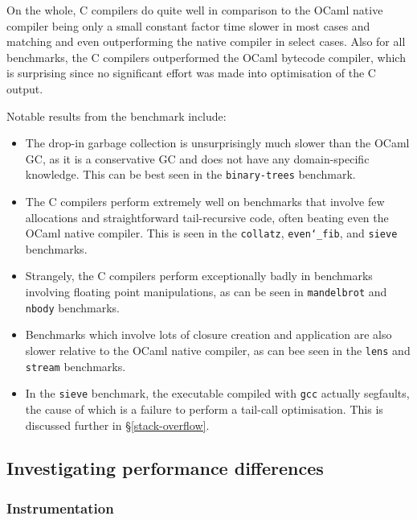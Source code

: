 On the whole, C compilers do quite well in comparison to the OCaml native
compiler being only a small constant factor time slower in most cases and
matching and even outperforming the native compiler in select cases. Also for
all benchmarks, the C compilers outperformed the OCaml bytecode compiler, which
is surprising since no significant effort was made into optimisation of the C
output.

Notable results from the benchmark include:

\begin{itemize}

\item The drop-in garbage collection is unsurprisingly much slower than the
    OCaml GC, as it is a conservative GC and does not have any domain-specific
    knowledge. This can be best seen in the \texttt{binary-trees} benchmark.

\item The C compilers perform extremely well on benchmarks that involve few
    allocations and straightforward tail-recursive code, often beating even the
    OCaml native compiler. This is seen in the \texttt{collatz},
    \texttt{even\char`_fib}, and \texttt{sieve} benchmarks.

\item Strangely, the C compilers perform exceptionally badly in benchmarks
    involving floating point manipulations, as can be seen in
    \texttt{mandelbrot} and \texttt{nbody} benchmarks.

\item Benchmarks which involve lots of closure creation and application are also
    slower relative to the OCaml native compiler, as can bee seen in the
    \texttt{lens} and \texttt{stream} benchmarks.

\item In the \texttt{sieve} benchmark, the executable compiled with \texttt{gcc}
    actually segfaults, the cause of which is a failure to perform a tail-call
    optimisation. This is discussed further in \S\ref{stack-overflow}.

\end{itemize}

\subsection{Investigating performance differences}

\subsubsection{Instrumentation}

